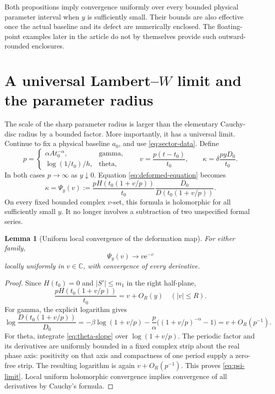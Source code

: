 \documentclass[11pt,a4paper]{article}
\numberwithin{equation}{section}
\newtheorem{lemma}[theorem]{Lemma}
\theoremstyle{definition}
\theoremstyle{remark}
\newcommand{\C}{\mathbb C}
\newcommand{\ee}{\mathrm e}
\begin{document}
Both propositions imply convergence uniformly over every bounded
physical parameter interval when \(y\) is sufficiently small. Their
bounds are also effective once the actual baseline and its defect are
numerically enclosed. The floating-point examples later in the article
do not by themselves provide such outward-rounded enclosures.

\section{A universal Lambert--\texorpdfstring{\(W\)}{W} limit and the parameter radius}
\label{sec:fold}

The scale of the sharp parameter radius is larger than the elementary
Cauchy-disc radius by a bounded factor. More importantly, it has a
universal limit. Continue to fix a physical baseline \(a_0\), and use
\eqref{eq:sector-data}. Define
\begin{equation}
 p=\begin{cases}
    \alpha A t_0^{-\alpha},&\text{gamma},\\
    \log(1/t_0)/h,&\text{theta},
   \end{cases}
 \qquad
 v=\frac{p(t-t_0)}{t_0},\qquad
 \kappa=\delta\frac{pyD_0}{t_0}.
 \label{eq:fold-scaling}
\end{equation}
In both cases \(p\to\infty\) as \(y\downarrow0\). Equation
\eqref{eq:deformed-equation} becomes
\begin{equation}
 \kappa=\Psi_y(v):=
 \frac{pH(t_0(1+v/p))}{t_0}
 \frac{D_0}{D(t_0(1+v/p))}.
 \label{eq:psi}
\end{equation}
On every fixed bounded complex \(v\)-set, this formula is holomorphic
for all sufficiently small \(y\). It no longer involves a subtraction
of two unspecified formal series.

\begin{lemma}[Uniform local convergence of the deformation map]
\label{lem:psi-limit}
For either family,
\begin{equation}
 \Psi_y(v)\longrightarrow v\ee^{-v}
 \label{eq:psi-limit}
\end{equation}
locally uniformly in \(v\in\C\), with convergence of every derivative.
\end{lemma}
\begin{proof}
Since \(H(t_0)=0\) and \(|S'|\le m_1\) in the right half-plane,
\[
 \frac{pH(t_0(1+v/p))}{t_0}=v+O_R(y)
 \quad(|v|\le R).
\]
For gamma, the explicit logarithm gives
\[
 \log\frac{D(t_0(1+v/p))}{D_0}
 =-\beta\log(1+v/p)
  -\frac p\alpha\bigl((1+v/p)^{-\alpha}-1\bigr)
 =v+O_R(p^{-1}).
\]
For theta, integrate \eqref{eq:theta-slope} over
\(\log(1+v/p)\). The periodic factor and its derivatives are uniformly
bounded in a fixed complex strip about the real phase axis: positivity
on that axis and compactness of one period supply a zero-free strip.
The resulting logarithm is again \(v+O_R(p^{-1})\).
This proves \eqref{eq:psi-limit}. Local uniform holomorphic convergence
implies convergence of all derivatives by Cauchy's formula.
\end{proof}
\end{document}
